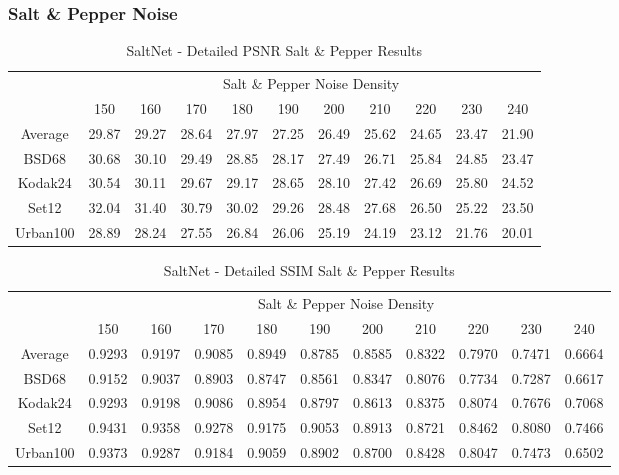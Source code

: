 
\subsubsection{Salt \& Pepper Noise}


\begin{table}[!hbt]
    \centering
    \begin{tabular}{ccccccccccc}
        \hline
        & \multicolumn{10}{c}{Salt \& Pepper Noise Density} \\
        & 150 & 160 & 170 & 180 & 190 & 200 & 210 & 220 & 230 & 240 \\
        \hline
        Average & 29.87 & 29.27 & 28.64 & 27.97 & 27.25 & 26.49 & 25.62 & 24.65 & 23.47 & 21.90 \\
        \hline
        BSD68 & 30.68 & 30.10 & 29.49 & 28.85 & 28.17 & 27.49 & 26.71 & 25.84 & 24.85 & 23.47 \\
        Kodak24 & 30.54 & 30.11 & 29.67 & 29.17 & 28.65 & 28.10 & 27.42 & 26.69 & 25.80 & 24.52 \\
        Set12 & 32.04 & 31.40 & 30.79 & 30.02 & 29.26 & 28.48 & 27.68 & 26.50 & 25.22 & 23.50 \\
        Urban100 & 28.89 & 28.24 & 27.55 & 26.84 & 26.06 & 25.19 & 24.19 & 23.12 & 21.76 & 20.01 \\
        \hline
    \end{tabular}
    \caption{SaltNet - Detailed PSNR Salt \& Pepper Results}
\end{table}

\begin{table}[!hbt]
    \centering
    \begin{tabular}{ccccccccccc}
        \hline
        & \multicolumn{10}{c}{Salt \& Pepper Noise Density} \\
        & 150 & 160 & 170 & 180 & 190 & 200 & 210 & 220 & 230 & 240 \\
        \hline
        Average & 0.9293 & 0.9197 & 0.9085 & 0.8949 & 0.8785 & 0.8585 & 0.8322 & 0.7970 & 0.7471 & 0.6664 \\
        \hline
        BSD68 & 0.9152 & 0.9037 & 0.8903 & 0.8747 & 0.8561 & 0.8347 & 0.8076 & 0.7734 & 0.7287 & 0.6617 \\
        Kodak24 & 0.9293 & 0.9198 & 0.9086 & 0.8954 & 0.8797 & 0.8613 & 0.8375 & 0.8074 & 0.7676 & 0.7068 \\
        Set12 & 0.9431 & 0.9358 & 0.9278 & 0.9175 & 0.9053 & 0.8913 & 0.8721 & 0.8462 & 0.8080 & 0.7466 \\
        Urban100 & 0.9373 & 0.9287 & 0.9184 & 0.9059 & 0.8902 & 0.8700 & 0.8428 & 0.8047 & 0.7473 & 0.6502 \\
        \hline
    \end{tabular}
    \caption{SaltNet - Detailed SSIM Salt \& Pepper Results}
\end{table}

